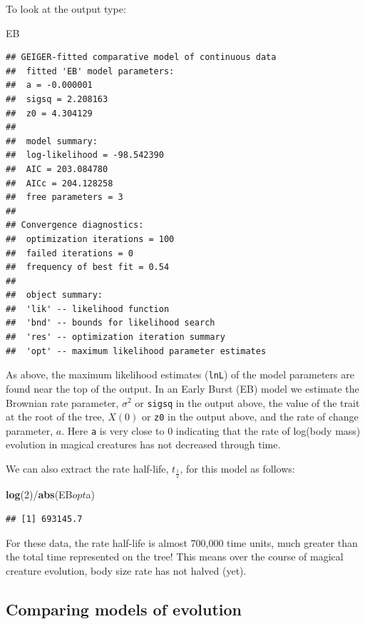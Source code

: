 \documentclass[]{book}
\newenvironment{Shaded}{\begin{snugshade}}{\end{snugshade}}
\newcommand{\KeywordTok}[1]{\textcolor[rgb]{0.13,0.29,0.53}{\textbf{{#1}}}}
\newcommand{\DecValTok}[1]{\textcolor[rgb]{0.00,0.00,0.81}{{#1}}}
\newcommand{\NormalTok}[1]{{#1}}
\begin{document}
To look at the output type:

\begin{Shaded}
\begin{Highlighting}[]
\NormalTok{EB}
\end{Highlighting}
\end{Shaded}

\begin{verbatim}
## GEIGER-fitted comparative model of continuous data
##  fitted 'EB' model parameters:
##  a = -0.000001
##  sigsq = 2.208163
##  z0 = 4.304129
## 
##  model summary:
##  log-likelihood = -98.542390
##  AIC = 203.084780
##  AICc = 204.128258
##  free parameters = 3
## 
## Convergence diagnostics:
##  optimization iterations = 100
##  failed iterations = 0
##  frequency of best fit = 0.54
## 
##  object summary:
##  'lik' -- likelihood function
##  'bnd' -- bounds for likelihood search
##  'res' -- optimization iteration summary
##  'opt' -- maximum likelihood parameter estimates
\end{verbatim}

As above, the maximum likelihood estimates (\texttt{lnL}) of the model
parameters are found near the top of the output. In an Early Burst (EB)
model we estimate the Brownian rate parameter, \(\sigma^2\) or
\texttt{sigsq} in the output above, the value of the trait at the root
of the tree, \(X(0)\) or \texttt{z0} in the output above, and the rate
of change parameter, \(a\). Here \texttt{a} is very close to 0
indicating that the rate of log(body mass) evolution in magical
creatures has not decreased through time.

We can also extract the rate half-life, \(t_{\frac{1}{2}}\), for this
model as follows:

\begin{Shaded}
\begin{Highlighting}[]
\KeywordTok{log}\NormalTok{(}\DecValTok{2}\NormalTok{)/}\KeywordTok{abs}\NormalTok{(EB$opt$a)}
\end{Highlighting}
\end{Shaded}

\begin{verbatim}
## [1] 693145.7
\end{verbatim}

For these data, the rate half-life is almost 700,000 time units, much
greater than the total time represented on the tree! This means over the
course of magical creature evolution, body size rate has not halved
(yet).

\subsection{Comparing models of
evolution}\label{comparing-models-of-evolution}
\end{document}
